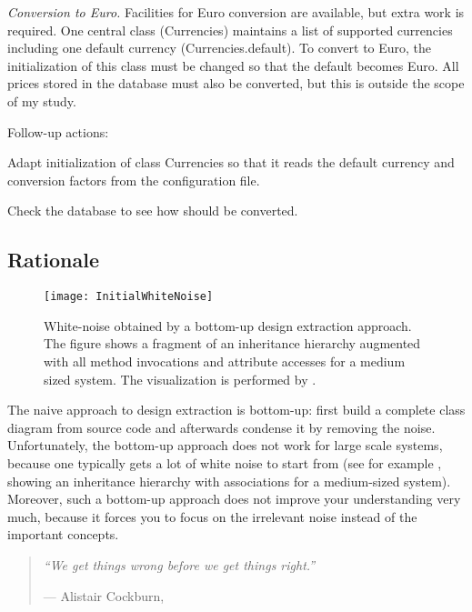 \documentclass[a4paper,10pt,twoside]{book}
\begin{document}
\noindent
\emph{Conversion to Euro.}
Facilities for Euro conversion are available, but extra work is required. One central class 
(Currencies) maintains a list of supported currencies including one default currency 
(Currencies.default). To convert to Euro, the initialization of this class must be changed 
so that the default becomes Euro. All prices stored in the database must also be converted, 
but this is outside the scope of my study.

Follow-up actions:

\begin{bulletlist}
\item Adapt initialization of class Currencies so that it reads the default currency and 
conversion factors from the configuration file.

\item Check the database to see how  should be converted.
\end{bulletlist}

\subsection*{Rationale}

\begin{figure}
\begin{center}
\texttt{[image: InitialWhiteNoise]}
\caption{White-noise obtained by a bottom-up design extraction approach. The figure shows a 
fragment of an inheritance hierarchy augmented with all method invocations and attribute 
accesses for a medium sized system. The visualization is performed by  
\cite{Deme99c} \cite{Lanz99a}.}
\end{center}
\end{figure}

The naive approach to design extraction is bottom-up: first build a complete class diagram 
from source code and afterwards condense it by removing the noise. Unfortunately, the 
bottom-up approach does not work for large scale systems, because one typically gets a lot 
of white noise to start from (see for example , showing an 
inheritance hierarchy with associations for a medium-sized system). Moreover, such a 
bottom-up approach does not improve your understanding very much, because it forces you to 
focus on the irrelevant noise instead of the important concepts.

\begin{quotation}
\noindent
\emph{``We get things wrong before we get things right.''}

\hfill --- Alistair Cockburn, \cite{Cock93a}
\end{quotation}
\end{document}
